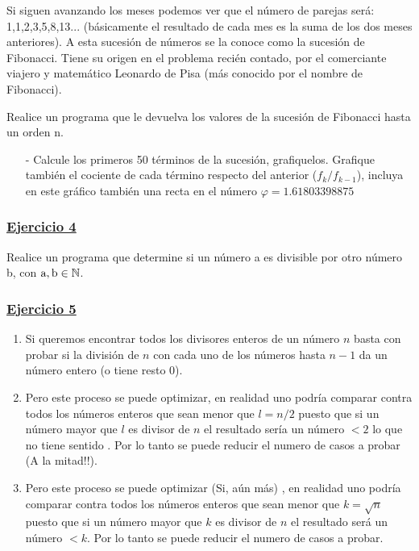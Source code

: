 \documentclass[a4paper,11pt]{article}
\theoremstyle{mytheor}
\begin{document}
Si siguen avanzando los meses podemos ver que el número de parejas será: 1,1,2,3,5,8,13... (básicamente el resultado de cada mes es la suma de los dos meses anteriores). A esta sucesión de números se la conoce como la sucesión de Fibonacci. Tiene su origen en el problema recién contado, por el comerciante viajero y matemático Leonardo de Pisa (más conocido por el nombre de Fibonacci).

Realice un programa que le devuelva los valores de la sucesión de Fibonacci hasta un orden n.\\

\begin{itemize}
\item[-] Calcule los primeros 50 términos de la sucesión, grafiquelos. Grafique también el cociente de cada término respecto del anterior ($ f_k / f_{k-1}$), incluya en este gráfico también una recta en el número $\varphi = 1.61803398875$
\end{itemize}


\subsubsection*{\underline{Ejercicio 4}}

Realice un programa que determine si un número a es divisible por otro número b, con $\text a, \text b \in \mathbb{N}$.

\subsubsection*{\underline{Ejercicio 5}}


\begin{enumerate}
\item Si queremos encontrar todos los divisores enteros de un número $n$ basta con probar si la división de $n$ con cada uno de los números hasta $n-1$ da un número entero (o tiene resto 0). 
\item Pero este proceso se puede optimizar, en realidad uno podría comparar contra todos los números enteros que sean menor que $l = n/2$ puesto que si un número  mayor que $l$ es divisor de $n$ el resultado sería un número $<2$ lo que no tiene sentido . Por lo tanto se puede reducir el numero de casos a probar (A la mitad!!).
\item Pero este proceso se puede optimizar (Si, aún más) , en realidad uno podría comparar contra todos los números enteros que sean menor que $k = \sqrt{n}$ puesto que si un número  mayor que $k$ es divisor de $n$ el resultado será un número $<k$. Por lo tanto se puede reducir el numero de casos a probar.


\end{enumerate}
\end{document}

